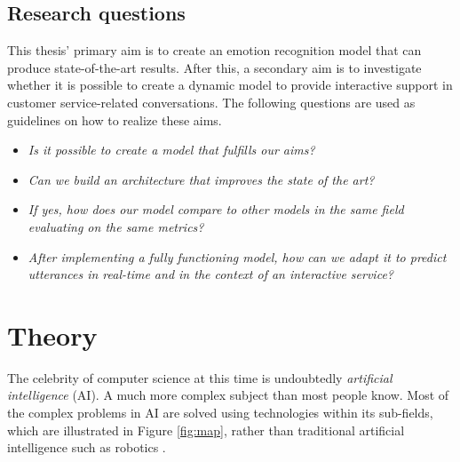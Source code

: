 \documentclass[nofilelist]{cslthse-msc}
\begin{document}
\section{Research questions}
\label{research_questions}
This thesis' primary aim is to create an emotion recognition model that can produce state-of-the-art results. After this, a secondary aim is to investigate whether it is possible to create a dynamic model to provide interactive support in customer service-related conversations. The following questions are used as guidelines on how to realize these aims.  

\begin{itemize}
    \item \textit{Is it possible to create a model that fulfills our aims?}
    \item \textit{Can we build an architecture that improves the state of the art?}
    \item \textit{If yes, how does our model compare to other models in the same field evaluating on the same metrics?}
    \item \textit{After implementing a fully functioning model, how can we adapt it to predict utterances in real-time and in the context of an interactive service?}
\end{itemize}












\chapter{Theory}

The celebrity of computer science at this time is undoubtedly \emph{artificial intelligence} (AI). A much more complex subject than most people know. Most of the complex problems in AI are solved using technologies within its sub-fields, which are illustrated in Figure \ref{fig:map}, rather than traditional artificial intelligence such as robotics \citep{bajwa_2020}. 
\end{document}
